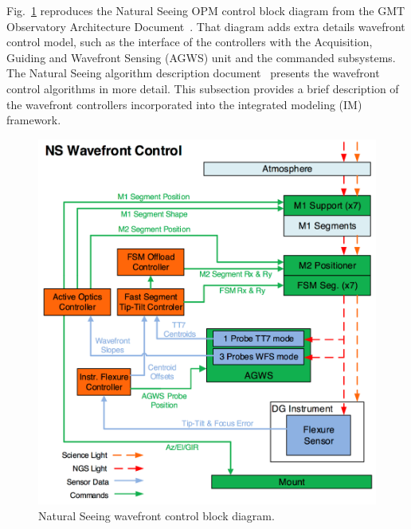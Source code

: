 \documentclass{gmto}
\begin{document}
Fig.~\ref{fig:ns-ctrl} reproduces the Natural Seeing OPM control block diagram from the GMT Observatory Architecture Document~\cite{OAD}. That diagram adds extra details wavefront control model, such as the interface of the controllers with the  Acquisition, Guiding and Wavefront Sensing (AGWS) unit and the commanded subsystems. The Natural Seeing algorithm description document~\cite{GMTO.NS.Alg.DOC} presents the wavefront control algorithms in more detail. This subsection provides a brief description of the wavefront controllers incorporated into the integrated modeling (IM) framework. 
\begin{figure}[!htb]
  \centering
  \includegraphics[width=0.7\linewidth]{ns-control.png}
  \caption{Natural Seeing wavefront control block diagram.}
  \label{fig:ns-ctrl}
\end{figure}


\end{document}
